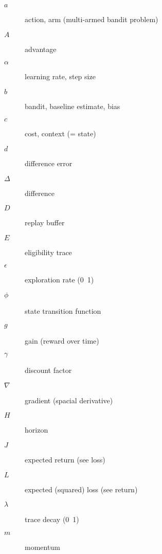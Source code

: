 \documentclass[10pt,landscape]{article}
\begin{document}
\begin{multicols}{3}
\begin{multicols}{2}
\begin{description}
    \item[$a$]
    action, arm (multi-armed bandit problem)
    \item[$A$]
    advantage
    \item[$\alpha$]
    learning rate, step size
    \item[$b$]
    bandit, baseline estimate, bias
    \item[$c$]
    cost, context (= state)
    \item[$d$]
    difference error
    \item[$\Delta$]
    difference
    \item[$D$]
    replay buffer
    \item[$E$]
    eligibility trace %
    \item[$\epsilon$]
    exploration rate (0~1)
    \item[$\phi$]
    state transition function
    \item[$g$]
    gain (reward over time) %
    \item[$\gamma$]
    discount factor
    \item[$\nabla$]
    gradient (spacial derivative)
    \item[$H$]
    horizon
    \item[$J$]
    expected return (see loss)
    \item[$L$]
    expected (squared) loss (see return)
    \item[$\lambda$]
    trace decay (0~1)
    \item[$m$]
    momentum %

\end{description}
\end{multicols}
\end{multicols}
\end{document}
